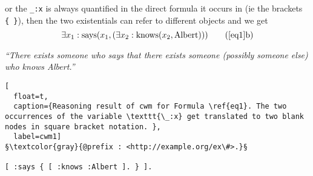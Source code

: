   or 
    the \texttt{\_:x} is always quantified in the direct formula it occurs in (ie the brackets \texttt{\{~\}}), then the two existentials can refer to different objects 
  and we get
%  
\[
\exists x_1 : \text{says}(x_1, (\exists x_2: \text{knows}(x_2, \text{Albert})))\tag{\ref{eq1}b} \label{zw}\]
\begin{center}\textit{``There exists someone who says that there exists someone (possibly someone else) who knows Albert.''}\end{center}
\begin{lstlisting}[
  float=t,
  caption={Reasoning result of cwm for Formula \ref{eq1}. The two occurrences of the variable \texttt{\_:x} get translated to two blank nodes in square bracket notation. },
  label=cwm1]
§\textcolor{gray}{@prefix : <http://example.org/ex\#>.}§

[ :says { [ :knows :Albert ]. } ].
\end{lstlisting}

